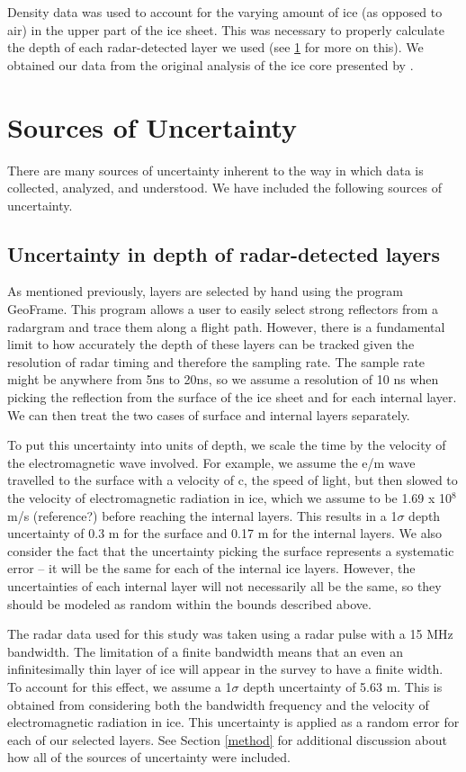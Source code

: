 \documentclass[draft,jgrga]{agutex}
\begin{document}
Density data was used to account for the varying amount of ice (as
opposed to air) in the upper part of the ice sheet. This was necessary to properly
calculate the depth of each radar-detected layer we used (see
\ref{unc} for more on this). We obtained our data from the
original analysis of the ice core presented by \citet{Gow68}.




\section{Sources of Uncertainty}\label{unc}
There are many sources of uncertainty inherent to the way in which
data is collected, analyzed, and understood. We have included the
following sources of uncertainty.

\subsection{Uncertainty in depth of radar-detected layers}

As mentioned previously, layers are selected by hand using the program
GeoFrame. This program allows a user to easily select strong
reflectors from a radargram and trace them along a flight
path. However, there is a fundamental limit to how accurately the
depth of these layers can be tracked given the resolution of radar
timing and therefore the sampling rate. The sample rate might be
anywhere from 5ns to 20ns, so we assume a resolution of 
10 ns when picking the reflection
from the surface of the ice sheet and for each internal
layer. We can then treat the two cases of surface and internal layers
separately.

To put this uncertainty into units of depth, we scale the time by
the velocity of the electromagnetic wave involved. For example, we
assume the e/m wave travelled to the surface with a velocity of c, the
speed of light, but then slowed to the velocity of electromagnetic
radiation in ice, which we assume to be 1.69 x 10$^8$ m/s (reference?)
before reaching the internal layers. This results in a 1$\sigma$ depth
uncertainty of 0.3 m for the surface and 0.17 m for the internal
layers. We also consider the fact that the uncertainty picking the
surface represents a systematic error -- it will be the same for each
of the internal ice layers. However, the uncertainties of each
internal layer will not necessarily all be the same, so they should be
modeled as random within the bounds described above.

The radar data used for this study was taken using a radar pulse with
a 15 MHz bandwidth. The limitation of a finite bandwidth means that
an even an infinitesimally thin layer of ice will appear in the survey
to have a finite width. To account for this effect, we assume a
1$\sigma$ depth uncertainty of 5.63 m. This is obtained from considering both
the bandwidth frequency and the velocity of electromagnetic radiation
in ice. This uncertainty is applied as a random error for each of our selected
layers. See Section \ref{method} for additional discussion about how
all of the sources of uncertainty were included.
\end{document}
